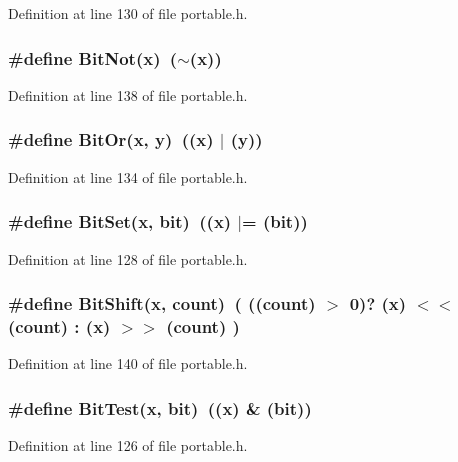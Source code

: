 Definition at line 130 of file portable.h.
\subsubsection{\setlength{\rightskip}{0pt plus 5cm}\#define Bit\-Not(x)\ ($\sim$(x))}\label{portable_8h_a50}




Definition at line 138 of file portable.h.
\subsubsection{\setlength{\rightskip}{0pt plus 5cm}\#define Bit\-Or(x, y)\ ((x) $|$ (y))}\label{portable_8h_a48}




Definition at line 134 of file portable.h.
\subsubsection{\setlength{\rightskip}{0pt plus 5cm}\#define Bit\-Set(x, bit)\ ((x) $|$= (bit))}\label{portable_8h_a45}




Definition at line 128 of file portable.h.
\subsubsection{\setlength{\rightskip}{0pt plus 5cm}\#define Bit\-Shift(x, count)\ ( ((count) $>$ 0)? (x) $<$$<$ (count) : (x) $>$$>$ (count) )}\label{portable_8h_a51}




Definition at line 140 of file portable.h.
\subsubsection{\setlength{\rightskip}{0pt plus 5cm}\#define Bit\-Test(x, bit)\ ((x) \& (bit))}\label{portable_8h_a44}




Definition at line 126 of file portable.h.
